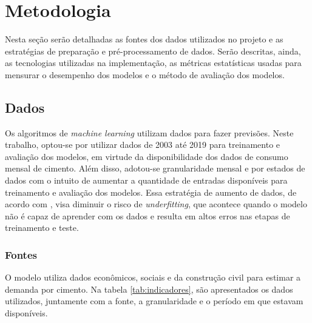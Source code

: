 
\chapter{Metodologia}



Nesta seção serão detalhadas as fontes dos dados utilizados no 
projeto e as estratégias de preparação e pré-processamento de 
dados. Serão descritas, ainda, as 
tecnologias utilizadas na implementação, as métricas estatísticas 
usadas para mensurar o desempenho dos modelos e o método de
 avaliação dos modelos.

\section{Dados}
\label{sec:dados}

Os algoritmos de \textit{machine learning} utilizam dados para fazer 
previsões. 
Neste trabalho, optou-se por utilizar dados de 2003 até 2019 para treinamento e 
avaliação dos modelos, em virtude da disponibilidade dos dados de consumo mensal 
de cimento. Além disso,
adotou-se granularidade
mensal e por estados de dados com o intuito de aumentar a quantidade de entradas disponíveis 
para treinamento e avaliação dos modelos.
Essa estratégia de aumento de dados, de acordo com \citet{Goodfellow-et-al-2016}, visa diminuir o risco de  
\textit{underfitting}, que acontece quando o 
modelo não é capaz de aprender com os dados e resulta em altos erros nas etapas de
treinamento e teste.


\subsection{Fontes}

O modelo utiliza dados econômicos, sociais e da construção
civil para estimar a demanda por cimento. Na tabela
\ref{tab:indicadores}, são
apresentados os dados utilizados, juntamente com a fonte, a granularidade 
e o período em que estavam disponíveis.


